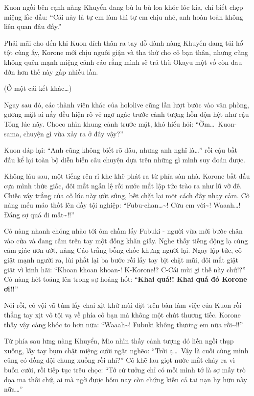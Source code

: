 \documentclass[../main.tex]{subfiles}
\begin{document}
Kuon ngồi bên cạnh nàng Khuyển đang bù lu bù loa khóc lóc kia, chỉ biết chẹp miệng lắc đầu: ``Cái này là tự em làm thì tự em chịu nhé, anh hoàn toàn không liên quan đâu đấy.''

Phải mãi cho đến khi Kuon đích thân ra tay dỗ dành nàng Khuyển đang tủi hổ tột cùng ấy, Korone mới chịu nguôi giận và tha thứ cho cô bạn thân, nhưng cũng không quên mạnh miệng cảnh cáo rằng mình sẽ trả thù Okayu một vố còn đau đớn hơn thế này gấp nhiều lần.

\omk

\begin{center}
  (Ở một cái kết khác\dots)
\end{center}

Ngay sau đó, các thành viên khác của hololive cũng lần lượt bước vào văn phòng, gương mặt ai nấy đều hiện rõ vẻ ngơ ngác trước cảnh tượng hỗn độn hệt như cậu Tổng lúc nãy. Choco nhìn khung cảnh trước mặt, khó hiểu hỏi: ``Ờm\dots\ Kuon-sama, chuyện gì vừa xảy ra ở đây vậy?''

Kuon đáp lại: ``Anh cũng không biết rõ đâu, nhưng anh nghĩ là\dots'' rồi cậu bắt đầu kể lại toàn bộ diễn biến câu chuyện dựa trên những gì mình suy đoán được.

Không lâu sau, một tiếng rên rỉ khe khẽ phát ra từ phía sàn nhà. Korone bắt đầu cựa mình thức giấc, đôi mắt ngấn lệ rồi nước mắt lập tức trào ra như lũ vỡ đê. Chiếc váy trắng của cô lúc này ướt sũng, bết chặt lại một cách đầy nhạy cảm. Cô nàng mếu máo thốt lên đầy tội nghiệp: ``Fubu-chan\dots\~{}! Cứu em với\~{}! Waaah\dots! Đáng sợ quá đi mất\~{}!!''


Cô nàng nhanh chóng nhào tới ôm chầm lấy Fubuki - người vừa mới bước chân vào cửa và đang cầm trên tay một đống khăn giấy. Nghe thấy tiếng động lạ cùng cảm giác ươn ướt, nàng Cáo trắng bỗng chốc khựng người lại. Ngay lập tức, cô giật mạnh người ra, lùi phắt lại ba bước rồi lấy tay bịt chặt mũi, đôi mắt giật giật vì kinh hãi: ``Khoan khoan khoan-! K-Korone!? C-Cái mùi gì thế này chứ!?'' Cô nàng hét toáng lên trong sự hoảng hốt: ``\textbf{Khai quá!! Khai quá đó Korone ơi!!}''

Nói rồi, cô vội vã túm lấy chai xịt khử mùi đặt trên bàn làm việc của Kuon rồi thẳng tay xịt vô tội vạ về phía cô bạn mà không một chút thương tiếc. Korone thấy vậy càng khóc to hơn nữa: ``Waaah\~{}! Fubuki không thương em nữa rồi\~{}!!''

Từ phía sau lưng nàng Khuyển, Mio nhìn thấy cảnh tượng đó liền ngồi thụp xuống, lấy tay bụm chặt miệng cười ngặt nghẽo: ``Trời ạ\dots\ Vậy là cuối cùng mình cũng có đồng đội chung xuồng rồi nhỉ?'' Cô khẽ lau giọt nước mắt chảy ra vì buồn cười, rồi tiếp tục trêu chọc: ``Tớ cứ tưởng chỉ có mỗi mình tớ là sợ mấy trò dọa ma thôi chứ, ai mà ngờ được hôm nay còn chứng kiến cả tai nạn hy hữu này nữa\dots''
\end{document}
